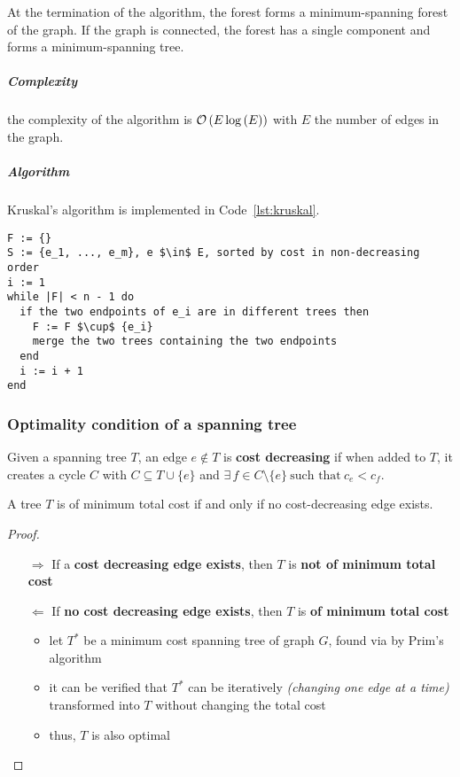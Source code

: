 \documentclass[english]{article}
\begin{document}
At the termination of the algorithm, the forest forms a minimum-spanning forest of the graph.
If the graph is connected, the forest has a single component and forms a minimum-spanning tree.

\subparagraph*{Complexity}
the complexity of the algorithm is \(\mathcal{O}\left(E \log{(E)}\right)\) with \(E\) the number of edges in the graph.

\subparagraph*{Algorithm}
Kruskal's algorithm is implemented in Code~\ref{lst:kruskal}.

\begin{lstlisting}[caption={Kruskal's algorithm}, label={lst:kruskal}, float]
F := {}
S := {e_1, ..., e_m}, e $\in$ E, sorted by cost in non-decreasing order
i := 1
while |F| < n - 1 do
  if the two endpoints of e_i are in different trees then
    F := F $\cup$ {e_i}
    merge the two trees containing the two endpoints
  end
  i := i + 1
end
\end{lstlisting}

\subsubsection{Optimality condition of a spanning tree}

Given a spanning tree \(T\), an edge \(e \notin T\) is \textbf{cost decreasing} if when added to \(T\), it creates a cycle \(C\) with \(C \subseteq T \cup \{e\}\) and \(\exists \, f \in C \setminus \{e\} \ \text{such that} \  c_e < c_f\).

\begin{theorem}
  A tree \(T\) is of minimum total cost if and only if no cost-decreasing edge exists.
\end{theorem}

\begin{proof}
  \hfill
  \begin{itemize}
    \item[\(\Rightarrow\)] If a \textbf{cost decreasing edge exists}, then \(T\) is \textbf{not of minimum total cost}
    \item[\(\Leftarrow\)] If \textbf{no cost decreasing edge exists}, then \(T\) is \textbf{of minimum total cost}
      \begin{itemize}
        \item let \(T^\ast\) be a minimum cost spanning tree of graph \(G\), found via by Prim's algorithm
        \item it can be verified that \(T^\ast\) can be iteratively \textit{(changing one edge at a time)} transformed into \(T\) without changing the total cost
        \item thus, \(T\) is also optimal
      \end{itemize}
  \end{itemize}

\end{proof}
\end{document}
